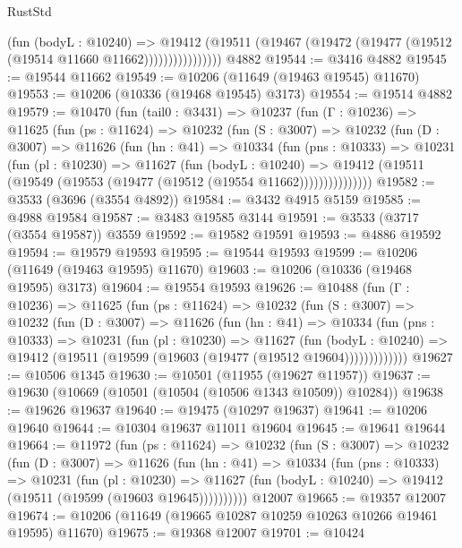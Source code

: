 \begin{lexlean}{RustStd}
\begin{coremodule}
                      (fun (bodyL : @10240) =>
                      @19412
                        (@19511
                          (@19467 (@19472 (@19477 (@19512 (@19514 @11660 @11662))))))))))))))))
    @4882
@19544 := @3416 @4882
@19545 := @19544 @11662
@19549 := @10206 (@11649 (@19463 @19545) @11670)
@19553 := @10206 (@10336 (@19468 @19545) @3173)
@19554 := @19514 @4882
@19579 := @10470
    (fun (tail0 : @3431) =>
    @10237
      (fun (Γ : @10236) =>
      @11625
        (fun (ps : @11624) =>
        @10232
          (fun (S : @3007) =>
          @10232
            (fun (D : @3007) =>
            @11626
              (fun (hn : @41) =>
              @10334
                (fun (pns : @10333) =>
                @10231
                  (fun (pl : @10230) =>
                  @11627
                    (fun (bodyL : @10240) =>
                    @19412 (@19511 (@19549 (@19553 (@19477 (@19512 (@19554 @11662)))))))))))))))
@19582 := @3533 (@3696 (@3554 @4892))
@19584 := @3432 @4915 @5159
@19585 := @4988 @19584
@19587 := @3483 @19585 @3144
@19591 := @3533 (@3717 (@3554 @19587)) @3559
@19592 := @19582 @19591
@19593 := @4886 @19592
@19594 := @19579 @19593
@19595 := @19544 @19593
@19599 := @10206 (@11649 (@19463 @19595) @11670)
@19603 := @10206 (@10336 (@19468 @19595) @3173)
@19604 := @19554 @19593
@19626 := @10488
    (fun (Γ : @10236) =>
    @11625
      (fun (ps : @11624) =>
      @10232
        (fun (S : @3007) =>
        @10232
          (fun (D : @3007) =>
          @11626
            (fun (hn : @41) =>
            @10334
              (fun (pns : @10333) =>
              @10231
                (fun (pl : @10230) =>
                @11627
                  (fun (bodyL : @10240) =>
                  @19412 (@19511 (@19599 (@19603 (@19477 (@19512 @19604)))))))))))))
@19627 := @10506 @1345
@19630 := @10501 (@11955 (@19627 @11957))
@19637 := @19630 (@10669 (@10501 (@10504 (@10506 @1343 @10509)) @10284))
@19638 := @19626 @19637
@19640 := @19475 (@10297 @19637)
@19641 := @10206 @19640
@19644 := @10304 @19637 @11011 @19604
@19645 := @19641 @19644
@19664 := @11972
    (fun (ps : @11624) =>
    @10232
      (fun (S : @3007) =>
      @10232
        (fun (D : @3007) =>
        @11626
          (fun (hn : @41) =>
          @10334
            (fun (pns : @10333) =>
            @10231
              (fun (pl : @10230) =>
              @11627 (fun (bodyL : @10240) => @19412 (@19511 (@19599 (@19603 @19645))))))))))
    @12007
@19665 := @19357 @12007
@19674 := @10206 (@11649 (@19665 @10287 @10259 @10263 @10266 @19461 @19595) @11670)
@19675 := @19368 @12007
@19701 := @10424

\end{coremodule}
\end{lexlean}
